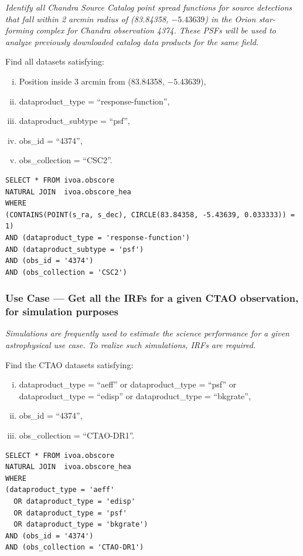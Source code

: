{\em Identify all Chandra Source Catalog point spread functions for source detections that fall within 2 arcmin radius of  (83.84358, $-5.43639$) in the Orion star-forming complex for Chandra observation 4374.  These PSFs will be used to analyze previously downloaded catalog data products for the same field.\/ }

\medskip
\noindent Find all datasets satisfying:
\begin{enumerate}[(i)]
  \item Position inside 3 arcmin from (83.84358, $-5.43639$),
  \item dataproduct\_type = ``response-function'',
  \item dataproduct\_subtype = ``psf'',
  \item obs\_id = ``4374'',
  \item obs\_collection = ``CSC2''.
\end{enumerate}

\begin{verbatim}
SELECT * FROM ivoa.obscore
NATURAL JOIN  ivoa.obscore_hea
WHERE
(CONTAINS(POINT(s_ra, s_dec), CIRCLE(83.84358, -5.43639, 0.033333)) = 1)
AND (dataproduct_type = 'response-function')
AND (dataproduct_subtype = 'psf')
AND (obs_id = '4374')
AND (obs_collection = 'CSC2')
\end{verbatim}


\subsubsection{Use Case --- Get all the \glspl{IRF} for a given CTAO observation, for simulation purposes}

{\em Simulations are frequently used to estimate the science performance for a given astrophysical use case. To realize such simulations, \glspl{IRF} are required.\/ }

\medskip
\noindent Find the CTAO datasets satisfying:
\begin{enumerate}[(i)]
  \item dataproduct\_type = ``aeff'' or dataproduct\_type = ``psf'' or dataproduct\_type = ``edisp'' or dataproduct\_type = ``bkgrate'',
  \item obs\_id = ``4374'',
  \item obs\_collection = ``CTAO-DR1''.
\end{enumerate}

\begin{verbatim}
SELECT * FROM ivoa.obscore
NATURAL JOIN  ivoa.obscore_hea
WHERE
(dataproduct_type = 'aeff'
  OR dataproduct_type = 'edisp'
  OR dataproduct_type = 'psf'
  OR dataproduct_type = 'bkgrate')
AND (obs_id = '4374')
AND (obs_collection = 'CTAO-DR1')
\end{verbatim}

